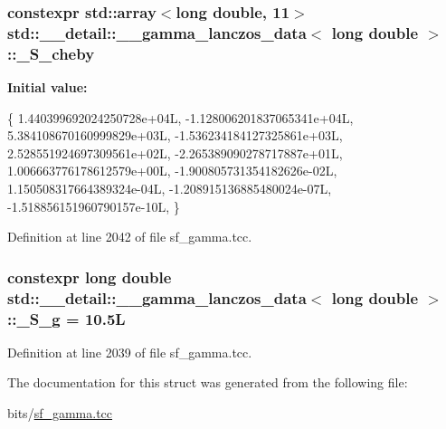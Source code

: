 \subsubsection[{\texorpdfstring{\+\_\+\+S\+\_\+cheby}{_S_cheby}}]{\setlength{\rightskip}{0pt plus 5cm}constexpr std\+::array$<$long double, 11$>$ {\bf std\+::\+\_\+\+\_\+detail\+::\+\_\+\+\_\+gamma\+\_\+lanczos\+\_\+data}$<$ long double $>$\+::\+\_\+\+S\+\_\+cheby\hspace{0.3cm}{\ttfamily [static]}}\hypertarget{structstd_1_1____detail_1_1____gamma__lanczos__data_3_01long_01double_01_4_a7968f4e72045e6a2b09244c678ddf3cc}{}\label{structstd_1_1____detail_1_1____gamma__lanczos__data_3_01long_01double_01_4_a7968f4e72045e6a2b09244c678ddf3cc}
{\bfseries Initial value\+:}
\begin{DoxyCode}
\{
     1.440399692024250728e+04L,
    -1.128006201837065341e+04L,
     5.384108670160999829e+03L,
    -1.536234184127325861e+03L,
     2.528551924697309561e+02L,
    -2.265389090278717887e+01L,
     1.006663776178612579e+00L,
    -1.900805731354182626e-02L,
     1.150508317664389324e-04L,
    -1.208915136885480024e-07L,
    -1.518856151960790157e-10L,
      \}
\end{DoxyCode}


Definition at line 2042 of file sf\+\_\+gamma.\+tcc.

\subsubsection[{\texorpdfstring{\+\_\+\+S\+\_\+g}{_S_g}}]{\setlength{\rightskip}{0pt plus 5cm}constexpr long double {\bf std\+::\+\_\+\+\_\+detail\+::\+\_\+\+\_\+gamma\+\_\+lanczos\+\_\+data}$<$ long double $>$\+::\+\_\+\+S\+\_\+g = 10.\+5L\hspace{0.3cm}{\ttfamily [static]}}\hypertarget{structstd_1_1____detail_1_1____gamma__lanczos__data_3_01long_01double_01_4_af86428283206e8b9bd3dc5709855c901}{}\label{structstd_1_1____detail_1_1____gamma__lanczos__data_3_01long_01double_01_4_af86428283206e8b9bd3dc5709855c901}


Definition at line 2039 of file sf\+\_\+gamma.\+tcc.



The documentation for this struct was generated from the following file\+:\begin{DoxyCompactItemize}
\item 
bits/\hyperlink{sf__gamma_8tcc}{sf\+\_\+gamma.\+tcc}\end{DoxyCompactItemize}
